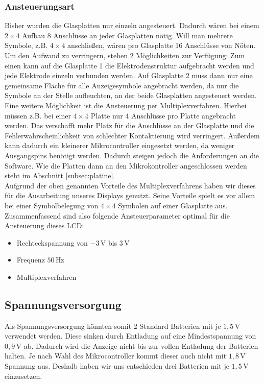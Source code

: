 \subsubsection{Ansteuerungsart}
Bisher wurden die Glasplatten nur einzeln angesteuert. Dadurch wären bei einem \(2\times4\) Aufbau 8 Anschlüsse an jeder Glasplatten nötig. Will man mehrere Symbole, z.B. \(4\times4\) anschließen, wären pro Glasplatte 16 Anschlüsse von Nöten. Um den Aufwand zu verringern, stehen 2 Möglichkeiten zur Verfügung: 
Zum einen kann auf die Glasplatte 1 die Elektrodenstruktur aufgebracht werden und jede Elektrode einzeln verbunden werden. Auf Glasplatte 2 muss dann nur eine gemeinsame Fläche für alle Anzeigesymbole angebracht werden, da nur die Symbole an der Stelle aufleuchten, an der beide Glasplatten angesteuert werden. Eine weitere Möglichkeit ist die Ansteuerung per Multiplexverfahren. Hierbei müssen z.B. bei einer \(4\times4\) Platte nur 4 Anschlüsse pro Platte angebracht werden. Das verschafft mehr Platz für die Anschlüsse an der Glasplatte und die Fehlerwahrscheinlichkeit von schlechter Kontaktierung wird verringert. Außerdem kann dadurch ein kleinerer Mikrocontroller eingesetzt werden, da weniger Ausgangspins benötigt werden. Dadurch steigen jedoch die Anforderungen an die Software. Wie die Platten dann an den Mikrokontroller angeschlossen werden steht im Abschnitt \ref{subsec:platine}.\\

Aufgrund der oben genannten Vorteile des Multiplexverfahrens haben wir dieses für die Ausarbeitung unseres Displays genutzt. Seine Vorteile spielt es vor allem bei einer Symbolbelegung von \(4\times4\) Symbolen auf einer Glasplatte aus.\\

Zusammenfassend sind also folgende Ansteuerparameter optimal für die Ansteuerung dieses LCD:
\begin{itemize}
\item Rechteckspannung von \(-3\,\textrm{V}\) bis \(3\,\textrm{V}\)
\item Frequenz \(50\,\textrm{Hz}\)
\item Multiplexverfahren\\
\end{itemize}

\subsection{Spannungsversorgung}
Als Spannungsversorgung könnten somit 2 Standard Batterien mit je \(1,5\,\textrm{V}\) verwendet werden. Diese sinken durch Entladung auf eine Mindestspannung von \(0,9\,\textrm{V}\) ab. Dadurch wird die Anzeige nicht bis zur vollen Entladung der Batterien halten. Je nach Wahl des Mikrocontroller kommt dieser auch nicht mit \(1,8\,\textrm{V}\) Spannung aus. Deshalb haben wir uns entschieden drei Batterien mit je \(1,5\,\textrm{V}\) einzusetzen.\\

